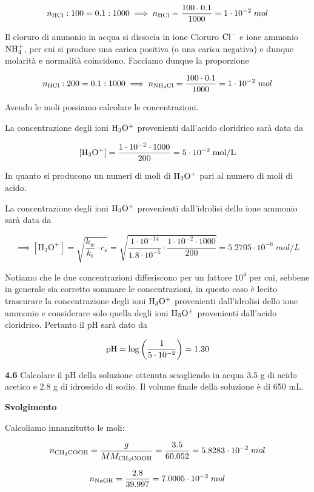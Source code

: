 $$n_{\rm HCl}:100=0.1:1000
\implies
n_{\rm HCl}=\frac{100 \cdot 0.1}{1000}=1 \cdot 10^{-2}\;mol$$

Il cloruro di ammonio in acqua si dissocia in ione Cloruro $\rm Cl^-$ e ione ammonio $\rm NH_4^+$, per cui si produce una carica positiva (o una carica negativa) e dunque molarità e normalità coincidono. Facciamo dunque la proporzione

$$n_{\rm HCl}:200=0.1:1000
\implies
n_{\rm NH_4Cl}=\frac{100 \cdot 0.1}{1000}=1 \cdot 10^{-2}\;mol$$

Avendo le moli possiamo calcolare le concentrazioni.

La concentrazione degli ioni $\rm H_3O^+$ provenienti dall'acido cloridrico sarà data da

$$[\rm H_3O^+]=\frac{1 \cdot 10^{-2} \cdot 1000}{200}=5 \cdot 10^{-2}\;mol/L$$

In quanto si producono un numeri di moli di $\rm H_3O^+$ pari al numero di moli di acido.

La concentrazione degli ioni $\rm H_3O^+$ provenienti dall'idrolisi dello ione ammonio sarà data da

$$\implies [\text{H}_3\text{O}^+]=\sqrt{\frac{k_w}{k_b} \cdot c_s}=\sqrt{\frac{1 \cdot 10^{-14}}{1.8 \cdot 10^{-5}} \cdot \frac{1 \cdot 10^{-2} \cdot 1000}{200}}=5.2705 \cdot 10^{-6}\;mol/L$$

Notiamo che le due concentrazioni differiscono per un fattore $10^4$ per cui, sebbene in generale sia corretto sommare le concentrazioni, in questo caso è lecito trascurare la concentrazione degli ioni $\rm H_3O^+$ provenienti dall'idrolisi dello ione ammonio e considerare solo quella degli ioni $\rm H_3O^+$ provenienti dall'acido cloridrico. Pertanto il pH sarà dato da

$$\rm pH=\log\left(\frac{1}{5 \cdot 10^{-2}}\right)=1.30$$

\vspace{0.2cm}\textbf{4.6} Calcolare il pH della soluzione ottenuta sciogliendo in acqua 3.5 g di acido acetico e 2.8 g di idrossido di sodio. Il volume finale della soluzione è di 650 mL.

\vspace{0.2cm}\large\textbf{Svolgimento}\normalsize

\vspace{0.2cm}Calcoliamo innanzitutto le moli:

$$n_{\rm CH_3COOH}=\frac{g}{MM_{\rm CH_3COOH}}=\frac{3.5}{60.052}=5.8283 \cdot 10^{-2}\;mol$$

$$n_{\rm NaOH}=\frac{2.8}{39.997}=7.0005 \cdot 10^{-2}\;mol$$

